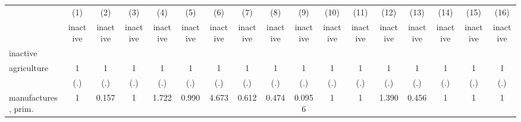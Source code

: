 {
\def\sym#1{\ifmmode^{#1}\else\(^{#1}\)\fi}
\begin{tabular}{l*{16}{c}}
\hline\hline
                    &\multicolumn{1}{c}{(1)}&\multicolumn{1}{c}{(2)}&\multicolumn{1}{c}{(3)}&\multicolumn{1}{c}{(4)}&\multicolumn{1}{c}{(5)}&\multicolumn{1}{c}{(6)}&\multicolumn{1}{c}{(7)}&\multicolumn{1}{c}{(8)}&\multicolumn{1}{c}{(9)}&\multicolumn{1}{c}{(10)}&\multicolumn{1}{c}{(11)}&\multicolumn{1}{c}{(12)}&\multicolumn{1}{c}{(13)}&\multicolumn{1}{c}{(14)}&\multicolumn{1}{c}{(15)}&\multicolumn{1}{c}{(16)}\\
                    &\multicolumn{1}{c}{inactive}&\multicolumn{1}{c}{inactive}&\multicolumn{1}{c}{inactive}&\multicolumn{1}{c}{inactive}&\multicolumn{1}{c}{inactive}&\multicolumn{1}{c}{inactive}&\multicolumn{1}{c}{inactive}&\multicolumn{1}{c}{inactive}&\multicolumn{1}{c}{inactive}&\multicolumn{1}{c}{inactive}&\multicolumn{1}{c}{inactive}&\multicolumn{1}{c}{inactive}&\multicolumn{1}{c}{inactive}&\multicolumn{1}{c}{inactive}&\multicolumn{1}{c}{inactive}&\multicolumn{1}{c}{inactive}\\
\hline
inactive            &                     &                     &                     &                     &                     &                     &                     &                     &                     &                     &                     &                     &                     &                     &                     &                     \\
agriculture         &           1         &           1         &           1         &           1         &           1         &           1         &           1         &           1         &           1         &           1         &           1         &           1         &           1         &           1         &           1         &           1         \\
                    &         (.)         &         (.)         &         (.)         &         (.)         &         (.)         &         (.)         &         (.)         &         (.)         &         (.)         &         (.)         &         (.)         &         (.)         &         (.)         &         (.)         &         (.)         &         (.)         \\
[1em]
manufactures, prim. &           1         &       0.157         &           1         &       1.722         &       0.990         &       4.673         &       0.612         &       0.474         &      0.0956         &           1         &           1         &       1.390         &       0.456         &           1         &           1         &           1         \\

\end{tabular}}
